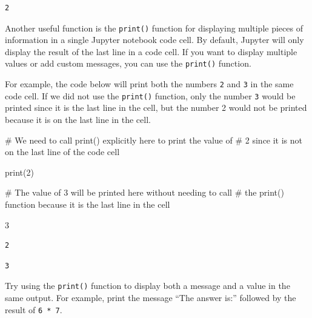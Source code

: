 \documentclass[
  letterpaper,
  DIV=11,
  numbers=noendperiod]{scrreprt}
\newenvironment{Shaded}{\begin{snugshade}}{\end{snugshade}}
\newcommand{\BuiltInTok}[1]{\textcolor[rgb]{0.00,0.23,0.31}{#1}}
\newcommand{\CommentTok}[1]{\textcolor[rgb]{0.37,0.37,0.37}{#1}}
\newcommand{\DecValTok}[1]{\textcolor[rgb]{0.68,0.00,0.00}{#1}}
\newcommand{\NormalTok}[1]{\textcolor[rgb]{0.00,0.23,0.31}{#1}}
\begin{document}
\begin{verbatim}
2
\end{verbatim}

Another useful function is the \texttt{print()} function for displaying
multiple pieces of information in a single Jupyter notebook code cell.
By default, Jupyter will only display the result of the last line in a
code cell. If you want to display multiple values or add custom
messages, you can use the \texttt{print()} function.

For example, the code below will print both the numbers \texttt{2} and
\texttt{3} in the same code cell. If we did not use the \texttt{print()}
function, only the number \texttt{3} would be printed since it is the
last line in the cell, but the number 2 would not be printed because it
is on the last line in the cell.

\begin{Shaded}
\begin{Highlighting}[]
\CommentTok{\# We need to call print() explicitly here to print the value of }
\CommentTok{\# 2 since it is not on the last line of the code cell}

\BuiltInTok{print}\NormalTok{(}\DecValTok{2}\NormalTok{)  }



\CommentTok{\# The value of 3 will be printed here without needing to call }
\CommentTok{\# the print() function because it is the last line in the cell}

\DecValTok{3}
\end{Highlighting}
\end{Shaded}

\begin{verbatim}
2
\end{verbatim}

\begin{verbatim}
3
\end{verbatim}

\begin{tcolorbox}[enhanced jigsaw, colframe=quarto-callout-tip-color-frame, toprule=.15mm, left=2mm, breakable, colbacktitle=quarto-callout-tip-color!10!white, arc=.35mm, opacityback=0, colback=white, leftrule=.75mm, title=\textcolor{quarto-callout-tip-color}{\faLightbulb}\hspace{0.5em}{Exercise}, bottomrule=.15mm, bottomtitle=1mm, toptitle=1mm, titlerule=0mm, rightrule=.15mm, opacitybacktitle=0.6, coltitle=black]

Try using the \texttt{print()} function to display both a message and a
value in the same output. For example, print the message ``The answer
is:'' followed by the result of \texttt{6\ *\ 7}.

\end{tcolorbox}
\end{document}
